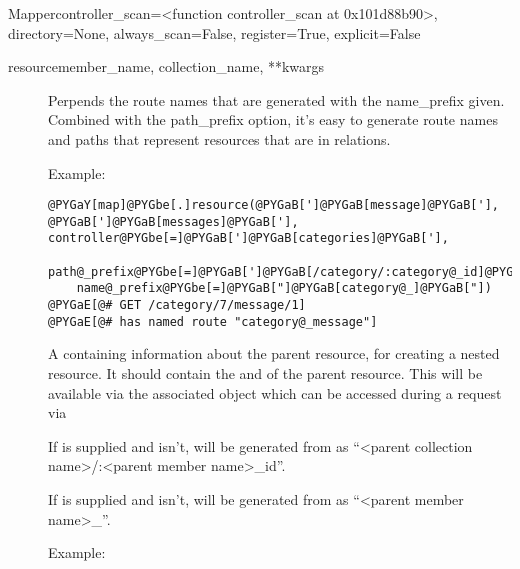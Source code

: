 \documentclass[letterpaper,10pt,english]{manual}
\begin{document}
\begin{classdesc}{Mapper}{controller\_scan=\textless{}function controller\_scan at 0x101d88b90\textgreater{}, directory=None, always\_scan=False, register=True, explicit=False}
\begin{methoddesc}{resource}{member\_name, collection\_name, **kwargs}
\begin{description}
\item[]
Perpends the route names that are generated with the
name\_prefix given. Combined with the path\_prefix option,
it's easy to generate route names and paths that represent
resources that are in relations.

Example:

\begin{Verbatim}[commandchars=@\[\]]
@PYGaY[map]@PYGbe[.]resource(@PYGaB[']@PYGaB[message]@PYGaB['], @PYGaB[']@PYGaB[messages]@PYGaB['], controller@PYGbe[=]@PYGaB[']@PYGaB[categories]@PYGaB['], 
    path@_prefix@PYGbe[=]@PYGaB[']@PYGaB[/category/:category@_id]@PYGaB['], 
    name@_prefix@PYGbe[=]@PYGaB["]@PYGaB[category@_]@PYGaB["])
@PYGaE[@# GET /category/7/message/1]
@PYGaE[@# has named route "category@_message"]
\end{Verbatim}

\item[ ]
A  containing information about the parent
resource, for creating a nested resource. It should contain
the  and  of the parent
resource. This  will 
be available via the associated  object which can
be accessed during a request via

If  is supplied and 
isn't,  will be generated from
 as
``\textless{}parent collection name\textgreater{}/:\textless{}parent member name\textgreater{}\_id''.

If  is supplied and 
isn't,  will be generated from
 as  ``\textless{}parent member name\textgreater{}\_''.

Example:


\end{description}
\end{methoddesc}
\end{classdesc}
\end{document}
